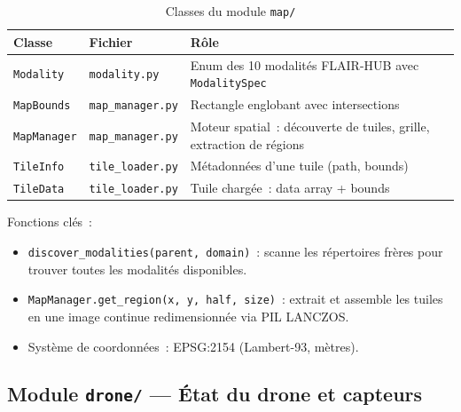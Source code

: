 \documentclass[a4paper, 11pt, french]{article}
\newcommand{\code}[1]{\texttt{#1}}
\begin{document}
\begin{table}[H]
\centering\small
\begin{tabular}{llp{7.5cm}}
\toprule
\textbf{Classe} & \textbf{Fichier} & \textbf{Rôle} \\
\midrule
\code{Modality}      & \code{modality.py}     & Enum des 10 modalités FLAIR-HUB avec
                                                  \code{ModalitySpec} \\
\code{MapBounds}     & \code{map\_manager.py} & Rectangle englobant avec intersections \\
\code{MapManager}    & \code{map\_manager.py} & Moteur spatial~: découverte de tuiles,
                                                  grille, extraction de régions \\
\code{TileInfo}      & \code{tile\_loader.py} & Métadonnées d'une tuile (path, bounds) \\
\code{TileData}      & \code{tile\_loader.py} & Tuile chargée~: data array + bounds \\
\bottomrule
\end{tabular}
\caption{Classes du module \code{map/}}
\end{table}

Fonctions clés~:
\begin{itemize}
  \item \code{discover\_modalities(parent, domain)}~: scanne les répertoires
        frères pour trouver toutes les modalités disponibles.
  \item \code{MapManager.get\_region(x, y, half, size)}~: extrait et assemble
        les tuiles en une image continue redimensionnée via PIL LANCZOS.
  \item Système de coordonnées~: EPSG:2154 (Lambert-93, mètres).
\end{itemize}

\subsection{Module \code{drone/} --- État du drone et capteurs}
\end{document}
